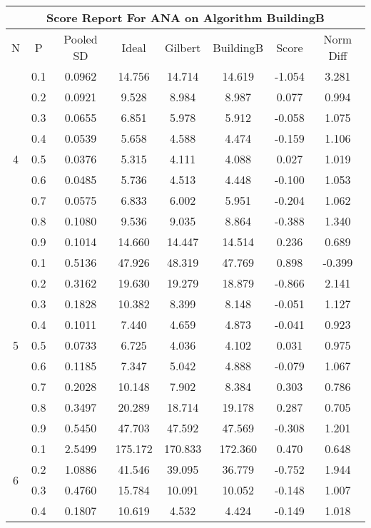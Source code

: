 \documentclass[11pt,a4paper]{report}
\begin{document}
\begin{longtable}{ | c | c || c | c | c | c | c | c | }
\hline
\multicolumn{8}{|c|}{ Score Report For ANA on Algorithm BuildingB} \\
\hline
N & P & Pooled SD &  Ideal &  Gilbert & BuildingB  & Score & Norm Diff \\
 \hline
 \hline
 \endhead
\multirow{9}{*}{4} & 0.1 & 0.0962 & 14.756 & 14.714 & 14.619 & -1.054 & 3.281 \\
 & 0.2 & 0.0921 & 9.528 & 8.984 & 8.987 & 0.077 & 0.994 \\
 & 0.3 & 0.0655 & 6.851 & 5.978 & 5.912 & -0.058 & 1.075 \\
 & 0.4 & 0.0539 & 5.658 & 4.588 & 4.474 & -0.159 & 1.106 \\
 & 0.5 & 0.0376 & 5.315 & 4.111 & 4.088 & 0.027 & 1.019 \\
 & 0.6 & 0.0485 & 5.736 & 4.513 & 4.448 & -0.100 & 1.053 \\
 & 0.7 & 0.0575 & 6.833 & 6.002 & 5.951 & -0.204 & 1.062 \\
 & 0.8 & 0.1080 & 9.536 & 9.035 & 8.864 & -0.388 & 1.340 \\
 & 0.9 & 0.1014 & 14.660 & 14.447 & 14.514 & 0.236 & 0.689 \\
 \hline
\multirow{9}{*}{5} & 0.1 & 0.5136 & 47.926 & 48.319 & 47.769 & 0.898 & -0.399 \\
 & 0.2 & 0.3162 & 19.630 & 19.279 & 18.879 & -0.866 & 2.141 \\
 & 0.3 & 0.1828 & 10.382 & 8.399 & 8.148 & -0.051 & 1.127 \\
 & 0.4 & 0.1011 & 7.440 & 4.659 & 4.873 & -0.041 & 0.923 \\
 & 0.5 & 0.0733 & 6.725 & 4.036 & 4.102 & 0.031 & 0.975 \\
 & 0.6 & 0.1185 & 7.347 & 5.042 & 4.888 & -0.079 & 1.067 \\
 & 0.7 & 0.2028 & 10.148 & 7.902 & 8.384 & 0.303 & 0.786 \\
 & 0.8 & 0.3497 & 20.289 & 18.714 & 19.178 & 0.287 & 0.705 \\
 & 0.9 & 0.5450 & 47.703 & 47.592 & 47.569 & -0.308 & 1.201 \\
 \hline
\multirow{9}{*}{6} & 0.1 & 2.5499 & 175.172 & 170.833 & 172.360 & 0.470 & 0.648 \\
 & 0.2 & 1.0886 & 41.546 & 39.095 & 36.779 & -0.752 & 1.944 \\
 & 0.3 & 0.4760 & 15.784 & 10.091 & 10.052 & -0.148 & 1.007 \\
 & 0.4 & 0.1807 & 10.619 & 4.532 & 4.424 & -0.149 & 1.018 \\

\end{longtable}
\end{document}

